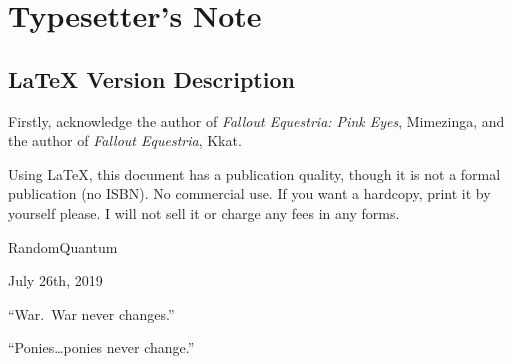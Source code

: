 \chapter{Typesetter's Note}

\section*{\LaTeX{} Version Description}

Firstly, acknowledge the author of \emph{Fallout Equestria: Pink Eyes}, Mimezinga, and the author of \emph{Fallout Equestria}, Kkat.

Using \LaTeX{}, this document has a publication quality, though it is not a formal publication (no ISBN). No commercial use. If you want a hardcopy, print it by yourself please. I will not sell it or charge any fees in any forms.

\begin{flushright}
RandomQuantum

July 26th, 2019
\end{flushright}

\clearpage

\begin{motto}
``War. War never changes.''

\medskip

``Ponies\dots ponies never change.''
\end{motto}


